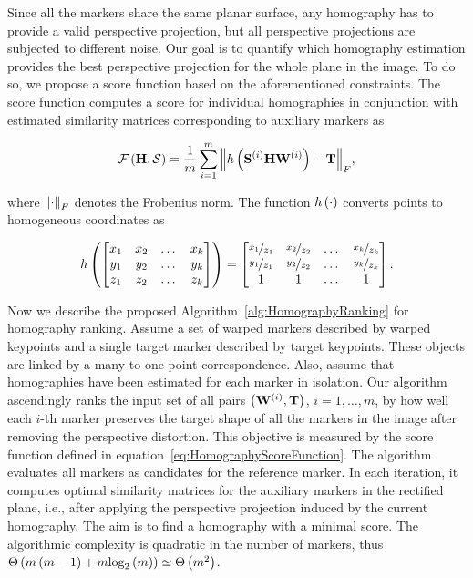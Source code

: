 Since all the markers share the same planar surface, any homography has to provide a valid perspective projection, but all perspective projections are subjected to different noise. Our goal is to quantify which homography estimation provides the best perspective projection for the whole plane in the image. To do so, we propose a score function based on the aforementioned constraints. The score function computes a score for individual homographies in conjunction with estimated similarity matrices corresponding to auxiliary markers as

\begin{equation}
    \label{eq:HomographyScoreFunction}
    {\mathcal{F}} \left( \mathbf{H}, \mathcal{S} \right) =
    \frac{1}{m}
    \sum_{i = 1}^{m}
    {\left\Vert {
        {h} \left( 
            {\mathbf{S}}^{\left( {i} \right)}
            \mathbf{H}{\mathbf{W}}^{\left( {i} \right)}
         \right)
        -
        \mathbf{T}
    } \right\Vert}_F,
\end{equation}

\noindent where ${\left\Vert {\cdot} \right\Vert}_F$ denotes the Frobenius norm. The function ${h} \left( \cdot \right)$ converts points to homogeneous coordinates as

\begin{equation}
    \label{eq:HomoCoordsConversion}
    {h} \left( 
        \begin{bmatrix}
            x_1 & x_2 & \dots & x_k\\
            y_1 & y_2 & \dots & y_k\\
            z_1 & z_2 & \dots & z_k
        \end{bmatrix}
     \right) =
    \begin{bmatrix}
        \nicefrac{x_1}{z_1} & \nicefrac{x_2}{z_2} & \dots & \nicefrac{x_k}{z_k}\\
        \nicefrac{y_1}{z_1} & \nicefrac{y_2}{z_2} & \dots & \nicefrac{y_k}{z_k}\\
        1                   & 1                   & \dots & 1
    \end{bmatrix}.
\end{equation}

Now we describe the proposed Algorithm~\ref{alg:HomographyRanking} for homography ranking. Assume a set of warped markers described by warped keypoints and a single target marker described by target keypoints. These objects are linked by a many-to-one point correspondence. Also, assume that homographies have been estimated for each marker in isolation. Our algorithm ascendingly ranks the input set of all pairs $\left( {{\mathbf{W}}^{\left( {i} \right)}, \mathbf{T}} \right)$, $i = 1, \dots, m$, by how well each $i$-th marker preserves the target shape of all the markers in the image after removing the perspective distortion. This objective is measured by the score function defined in equation~\eqref{eq:HomographyScoreFunction}. The algorithm evaluates all markers as candidates for the reference marker. In each iteration, it computes optimal similarity matrices for the auxiliary markers in the rectified plane, i.e., after applying the perspective projection induced by the current homography. The aim is to find a homography with a minimal score. The algorithmic complexity is quadratic in the number of markers, thus ${\Theta} \left( m \left( {m - 1} \right) + m {\text{log}_2} \left( m \right) \right) \simeq {\Theta} \left( m^2 \right)$.

